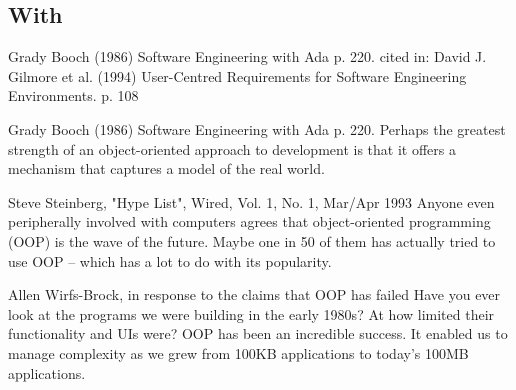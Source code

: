 \documentclass[12pt]{book}
\begin{document}


\subsection{With}

Grady Booch (1986) Software Engineering with Ada p. 220. cited in: David J. Gilmore et al. (1994) User-Centred Requirements for Software Engineering Environments. p. 108
\begin{kodequote}{Grady Booch (1986) Software Engineering with Ada p. 220. }
	Perhaps the greatest strength of an object-oriented approach to development is that it offers a mechanism that captures a model of the real world.
\end{kodequote}


\begin{kodequote}{Steve Steinberg, "Hype List", Wired, Vol. 1, No. 1, Mar/Apr 1993}
	Anyone even peripherally involved with computers agrees that object-oriented programming (OOP) is the wave of the future. Maybe one in 50 of them has actually tried to use OOP – which has a lot to do with its popularity.
\end{kodequote}

\begin{kodequote}{Allen Wirfs-Brock, in response to the claims that OOP has failed}
	Have you ever look at the programs we were building in the early 1980s? At how limited their functionality and UIs were? OOP has been an incredible success. It enabled us to manage complexity as we grew from 100KB applications to today’s 100MB applications.
\end{kodequote}



\ifx\wholebook\relax\else
% 
% 
	
\end{document}

